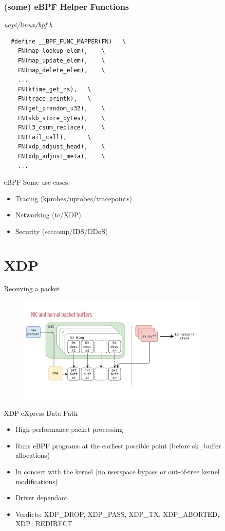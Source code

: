 \documentclass{beamer}
\begin{document}
\begin{frame}[fragile]
  \frametitle{(some) eBPF Helper Functions}
  \textit{uapi/linux/bpf.h~}
  \begin{verbatim}
  #define __BPF_FUNC_MAPPER(FN)   \
    FN(map_lookup_elem),    \
    FN(map_update_elem),    \
    FN(map_delete_elem),    \
    ...
    FN(ktime_get_ns),   \
    FN(trace_printk),   \
    FN(get_prandom_u32),    \
    FN(skb_store_bytes),    \
    FN(l3_csum_replace),    \
    FN(tail_call),      \
    FN(xdp_adjust_head),    \
    FN(xdp_adjust_meta),    \
    ...
\end{verbatim}
\end{frame}

\begin{frame}{eBPF}
  Some use cases:
  \begin{itemize}
    \item Tracing (kprobes/uprobes/tracepoints)\footnotemark
    \item Networking (tc/XDP)
    \item Security (seccomp/IDS/DDoS)
  \end{itemize}
\end{frame}

\section{XDP}
\begin{frame}{Receiving a packet}
  \begin{figure}
    \includegraphics[width=0.85\textwidth]{./dma-nic.jpg}

  \end{figure}
\end{frame}
\begin{frame}{XDP}
  eXpress Data Path
  \begin{itemize}
    \item High-performance packet processing
    \item Runs eBPF programs at the earliest possible point (before sk\_buffer allocations)
    \item In concert with the kernel (no userspace bypass or out-of-tree kernel modifications)
    \item Driver dependant
    \item Verdicts: XDP\_DROP, XDP\_PASS, XDP\_TX, XDP\_ABORTED, XDP\_REDIRECT
  \end{itemize}
\end{frame}
\end{document}
